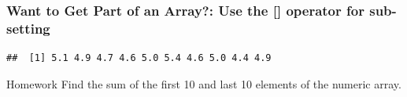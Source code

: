 \subsubsection{Want to Get Part of an Array?: Use the [] operator for sub-setting}
\begin{knitrout}
\color{fgcolor}\begin{kframe}
\begin{alltt}
\hlopt{$}\hlstd{Sepal.Length[}\hlopt{:}\hlstd{]}
\end{alltt}
\begin{verbatim}
##  [1] 5.1 4.9 4.7 4.6 5.0 5.4 4.6 5.0 4.4 4.9
\end{verbatim}
\end{kframe}
\end{knitrout}

\begin{DIY}{Homework}
Find the sum of the first 10 and last 10 elements of the numeric array.
\end{DIY}

